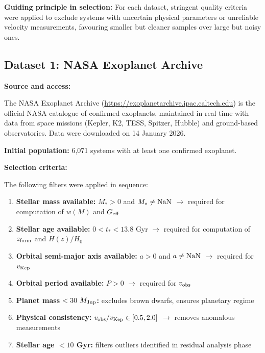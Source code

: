 \documentclass[11pt,a4paper]{article}
\providecommand{\tightlist}{\setlength{\itemsep}{0pt}\setlength{\parskip}{0pt}}
\begin{document}
\textbf{Guiding principle in selection:} For each dataset, stringent
quality criteria were applied to exclude systems with uncertain physical
parameters or unreliable velocity measurements, favouring smaller but
cleaner samples over large but noisy ones.

\hypertarget{dataset-1-nasa-exoplanet-archive}{%
\subsection{Dataset 1: NASA Exoplanet
Archive}\label{dataset-1-nasa-exoplanet-archive}}

\textbf{Source and access:}

The NASA Exoplanet Archive (\url{https://exoplanetarchive.ipac.caltech.edu})
is the official NASA catalogue of confirmed exoplanets, maintained in
real time with data from space missions (Kepler, K2, TESS, Spitzer,
Hubble) and ground-based observatories. Data were downloaded on 14
January 2026.

\textbf{Initial population:} 6,071 systems with at least one confirmed
exoplanet.

\textbf{Selection criteria:}

The following filters were applied in sequence:

\begin{enumerate}
\def\labelenumi{\arabic{enumi}.}
\tightlist
\item
  \textbf{Stellar mass available:} \(M_* > 0\) and
  \(M_* \neq {\rm NaN}\) $\rightarrow$ required for computation of \(w(M)\) and
  \(G_{\rm eff}\)
\item
  \textbf{Stellar age available:} \(0 < t_* < 13.8\) Gyr $\rightarrow$ required for
  computation of \(z_{\rm form}\) and \(H(z)/H_0\)
\item
  \textbf{Orbital semi-major axis available:} \(a > 0\) and
  \(a \neq {\rm NaN}\) $\rightarrow$ required for \(v_{\rm Kep}\)
\item
  \textbf{Orbital period available:} \(P > 0\) $\rightarrow$ required for
  \(v_{\rm obs}\)
\item
  \textbf{Planet mass \(< 30~M_{\rm Jup}\):} excludes brown dwarfs,
  ensures planetary regime
\item
  \textbf{Physical consistency:}
  \(v_{\rm obs}/v_{\rm Kep} \in [0.5, 2.0]\) $\rightarrow$ removes anomalous
  measurements
\item
  \textbf{Stellar age \(< 10\) Gyr:} filters outliers identified in
  residual analysis phase
\end{enumerate}
\end{document}
